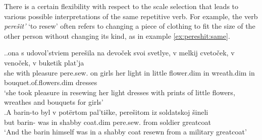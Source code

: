 %
%
%

There is a certain flexibility with respect to the scale selection that leads to various possible interpretations of the same repetitive  verb. For example, the verb \textit{pere\v{s}it'} `to resew' often refers to changing a piece of clothing to fit the size of the other person without changing its kind, as in example \ref{ex:pereshit:same}.

\ex.\label{ex:pereshit}\ag.\label{ex:pereshit:same}ona s udovol'stviem pere\v{s}ila na devo\v{c}ek svoi svetlye, v melkij cveto\v{c}ek, v veno\v{c}ek, v buketik plat'ja\\
she with pleasure pere.sew. on girls her light in little flower.dim in wreath.dim in bouquet.of.flowers.dim dresses\\
\trans `she took pleasure in resewing her light dresses with prints of little flowers, wreathes and bouquets for girls'\\
\bg.\label{ex:pereshit:other}A barin-to byl v pot\"{e}rtom pal'ti\v{s}ke, pere\v{s}itom iz soldatskoj \v{s}ineli\\
but barin- was in shabby coat.dim pere.sew. from soldier greatcoat\\
\trans `And the barin himself was in a shabby coat resewn from a military greatcoat'


